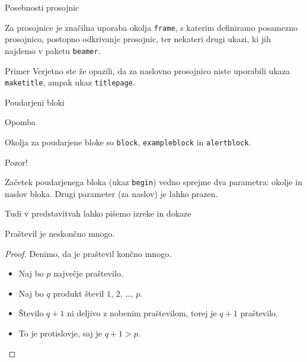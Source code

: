 \begin{frame}{Posebnosti prosojnic}

	Za prosojnice je značilna uporaba okolja \texttt{frame},
	s katerim definiramo posamezno prosojnico, \pause
	postopno odkrivanje prosojnic,\pause
	ter nekateri drugi ukazi, ki jih najdemo v paketu \texttt{beamer}.\pause
	\begin{exampleblock}{Primer}
		Verjetno ste že opazili, da za naslovno prosojnico niste uporabili
		ukaza \texttt{maketitle}, ampak ukaz \texttt{titlepage}.
	\end{exampleblock}
\end{frame}

\begin{frame}{Poudarjeni bloki}
\begin{block}{Opomba}


		Okolja za poudarjene bloke so \texttt{block}, \texttt{exampleblock} in \texttt{alertblock}.
\end{block}
\begin{alertblock}{Pozor!}
	

		Začetek poudarjenega bloka (ukaz \texttt{begin}) vedno sprejme 
		dva parametra: okolje in naslov bloka.
		Drugi parameter (za naslov) je lahko prazen. 
\end{alertblock}
\end{frame}

\begin{frame}{Tudi v predstavitvah lahko pišemo izreke in dokaze}

	\begin{izrek}
	   Praštevil je neskončno mnogo.
	\end{izrek}
	\begin{proof}
	   Denimo, da je praštevil končno mnogo.
	   \begin{itemize}[<+->]
		  \item Naj bo $p$ \alert<4>{največje} praštevilo.
		  \item Naj bo $q$ produkt števil $1$, $2$, \ldots, $p$.
		  \item Število $q+1$ ni deljivo z nobenim praštevilom, torej je $q+1$ praštevilo.
		  \item To je protislovje, saj je $q+1>p$. \qedhere
	   \end{itemize}
	\end{proof}
 \end{frame}
 
